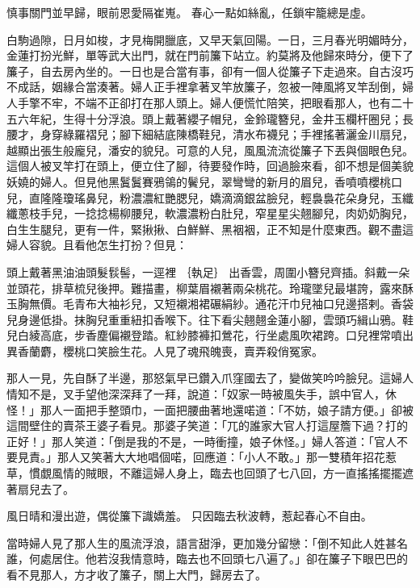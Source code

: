 \begin{showcontents}{}
慎事關門並早歸，眼前恩愛隔崔嵬。
春心一點如絲亂，任鎖牢籠總是虛。

白駒過隙，日月如梭，才見梅開臘底，又早天氣回陽。一日，三月春光明媚時分，金蓮打扮光鮮，單等武大出門，就在門前簾下站立。約莫將及他歸來時分，便下了簾子，自去房內坐的。一日也是合當有事，卻有一個人從簾子下走過來。自古沒巧不成話，姻緣合當湊著。婦人正手裡拿著叉竿放簾子，忽被一陣風將叉竿刮倒，婦人手擎不牢，不端不正卻打在那人頭上。婦人便慌忙陪笑，把眼看那人，也有二十五六年紀，生得十分浮浪。頭上戴著纓子帽兒，金鈴瓏簪兒，金井玉欄杆圈兒；長腰才，身穿綠羅褶兒；腳下細結底陳橋鞋兒，清水布襪兒；手裡搖著灑金川扇兒，越顯出張生般龐兒，潘安的貌兒。可意的人兒，風風流流從簾子下丟與個眼色兒。這個人被叉竿打在頭上，便立住了腳，待要發作時，回過臉來看，卻不想是個美貌妖嬈的婦人。但見他黑鬒鬒賽鴉鴒的鬢兒，翠彎彎的新月的眉兒，香噴噴櫻桃口兒，直隆隆瓊瑤鼻兒，粉濃濃紅艷腮兒，嬌滴滴銀盆臉兒，輕裊裊花朵身兒，玉纖纖蔥枝手兒，一捻捻楊柳腰兒，軟濃濃粉白肚兒，窄星星尖翹腳兒，肉奶奶胸兒，白生生腿兒，更有一件，緊揪揪、白鮮鮮、黑裀裀，正不知是什麼東西。觀不盡這婦人容貌。且看他怎生打扮？但見：

頭上戴著黑油油頭髮䯼髻，一逕裡
｛執足｝ %
出香雲，周圍小簪兒齊插。斜戴一朵並頭花，排草梳兒後押。難描畫，柳葉眉襯著兩朵桃花。玲瓏墜兒最堪誇，露來酥玉胸無價。毛青布大袖衫兒，又短襯湘裙碾絹紗。通花汗巾兒袖口兒邊搭剌。香袋兒身邊低掛。抹胸兒重重紐扣香喉下。往下看尖翹翹金蓮小腳，雲頭巧緝山鴉。鞋兒白綾高底，步香塵偏襯登踏。紅紗膝褲扣鶯花，行坐處風吹裙跨。口兒裡常噴出異香蘭麝，櫻桃口笑臉生花。人見了魂飛魄喪，賣弄殺俏冤家。

那人一見，先自酥了半邊，那怒氣早已鑽入爪窪國去了，變做笑吟吟臉兒。這婦人情知不是，叉手望他深深拜了一拜，說道：「奴家一時被風失手，誤中官人，休怪！」那人一面把手整頭巾，一面把腰曲著地還喏道：「不妨，娘子請方便。」卻被這間壁住的賣茶王婆子看見。那婆子笑道：「兀的誰家大官人打這屋簷下過？打的正好！」那人笑道：「倒是我的不是，一時衝撞，娘子休怪。」婦人答道：「官人不要見責。」那人又笑著大大地唱個喏，回應道：「小人不敢。」那一雙積年招花惹草，慣覷風情的賊眼，不離這婦人身上，臨去也回頭了七八回，方一直搖搖擺擺遮著扇兒去了。

風日晴和漫出遊，偶從簾下識嬌羞。
只因臨去秋波轉，惹起春心不自由。

當時婦人見了那人生的風流浮浪，語言甜淨，更加幾分留戀：「倒不知此人姓甚名誰，何處居住。他若沒我情意時，臨去也不回頭七八遍了。」卻在簾子下眼巴巴的看不見那人，方才收了簾子，關上大門，歸房去了。


\end{showcontents}
